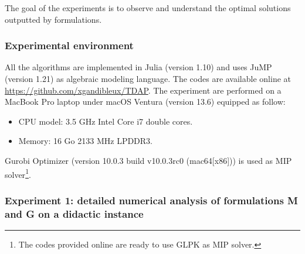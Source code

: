 \documentclass[preprint,12pt,authoryear]{elsarticle}
\begin{document}
The goal of the experiments is to observe and understand the optimal solutions outputted by formulations.


%
%
\subsubsection{Experimental environment}

All the algorithms are implemented in Julia (version 1.10) and uses JuMP (version 1.21) as algebraic modeling language.
The codes are available online at \url{https://github.com/xgandibleux/TDAP}.
The experiment are performed on a  MacBook Pro laptop under macOS Ventura (version 13.6) equipped as follow:
\begin{itemize}
    \item CPU model: 3.5 GHz Intel Core i7 double cores.
    \item Memory: 16 Go 2133 MHz LPDDR3.
\end{itemize}
Gurobi Optimizer (version 10.0.3 build v10.0.3rc0 (mac64[x86]))  is used as MIP solver\footnote{The codes provided online are ready to use GLPK as MIP solver.}.  

%
%
\subsubsection{Experiment 1: detailed numerical analysis of formulations M and G on a didactic instance}\label{sec:didacticMG}
\end{document}

